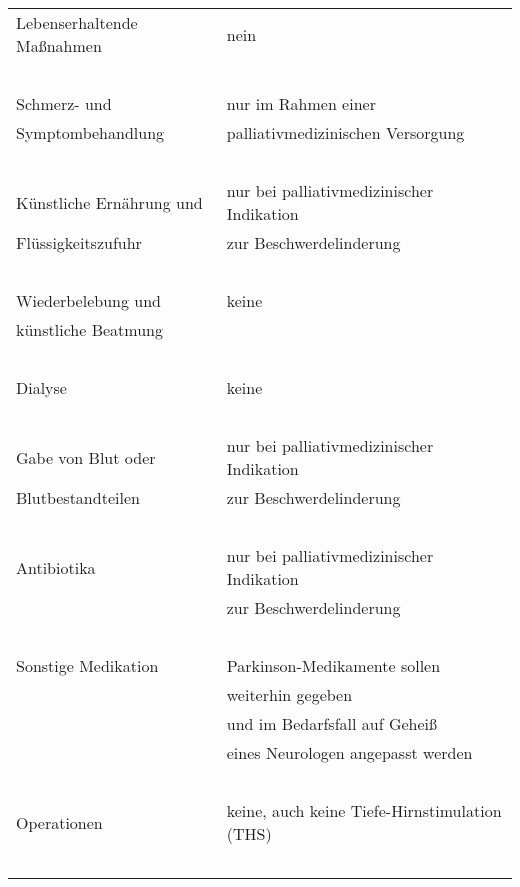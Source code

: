 \documentclass[pdftex,12pt,a4paper]{article}
\begin{document}
\begin{tabular}{ll}



Lebenserhaltende Maßnahmen & nein \\

~  & ~ \\


Schmerz- und  & nur im Rahmen einer \\
Symptombehandlung & palliativmedizinischen Versorgung \\

~  & ~ \\


Künstliche Ernährung und & nur bei palliativmedizinischer Indikation \\
Flüssigkeitszufuhr &  zur Beschwerdelinderung \\

~  & ~ \\


Wiederbelebung und & keine \\
künstliche Beatmung & ~ \\

~  & ~ \\


Dialyse & keine \\

~  & ~ \\


Gabe von Blut oder & nur bei palliativmedizinischer Indikation \\ 
Blutbestandteilen & zur Beschwerdelinderung \\

~  & ~ \\


Antibiotika & nur bei palliativmedizinischer Indikation \\
~ &  zur Beschwerdelinderung \\

~  & ~ \\


Sonstige Medikation & Parkinson-Medikamente sollen \\
~ & weiterhin gegeben  \\

~ & und im Bedarfsfall auf Geheiß \\
~ & eines Neurologen angepasst werden \\

~  & ~ \\


Operationen & keine, auch keine Tiefe-Hirnstimulation (THS) \\ 

~  & ~ \\




\end{tabular}
\end{document}
